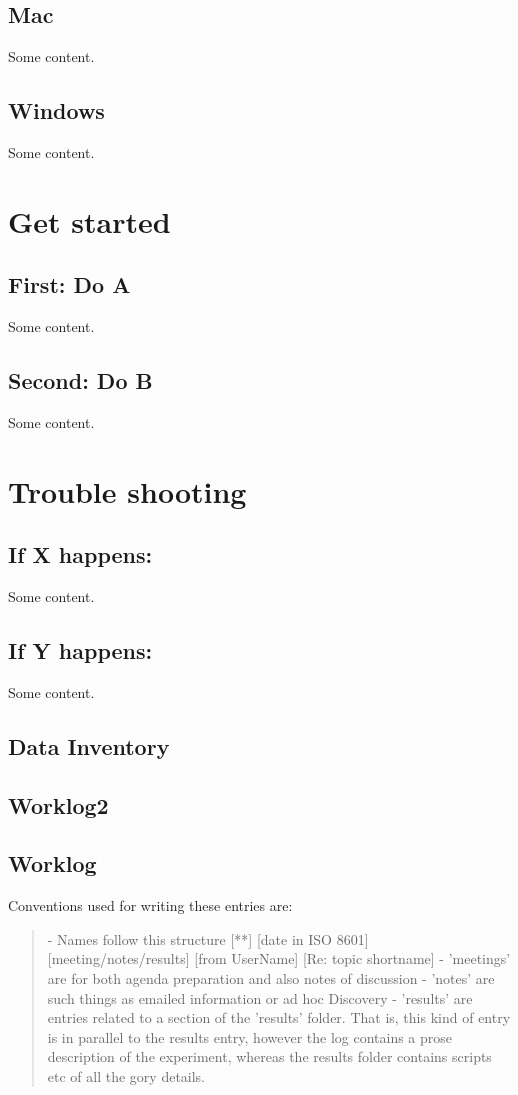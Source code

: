 \documentclass[a4paper]{article}
\begin{document}
\subsection*{Mac}\label{mac}
Some content.

\subsection*{Windows}\label{win}
Some content.
\clearpage
\section*{Get started}\label{start}
\subsection*{First: Do A}\label{caseA}
Some content.

\subsection*{Second: Do B}\label{caseB}
 Some content.
\clearpage
\section*{Trouble shooting}\label{trbl-shoot}
\subsection*{If X happens:}\label{caseX}
Some content.

\subsection*{If Y happens:}\label{caseY}
 Some content.

\subsection*{Data Inventory}\label{datinv}
\subsection*{Worklog2}\label{mac2}
\subsection*{Worklog}\label{mac3}

Conventions used for writing these entries are:
\begin{quote}
- Names follow this structure [**] [date in ISO 8601] [meeting/notes/results] [from UserName] [Re: topic shortname]
- 'meetings' are for both agenda preparation and also notes of discussion
- 'notes' are such things as emailed information or ad hoc Discovery
- 'results' are entries related to a section of the 'results' folder. 
  That is, this kind of entry is in parallel to the results entry,
  however the log contains a prose description of the experiment,
  whereas the results folder contains scripts etc of all the gory
  details.  
\end{quote}
\end{document}
